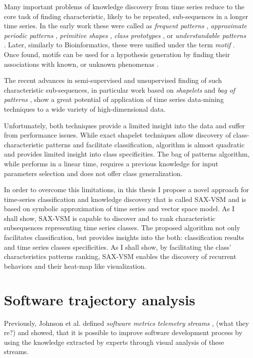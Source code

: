 Many important problems of knowledge discovery from time series reduce to the core task of finding 
characteristic, likely to be repeated, sub-sequences in a longer time series. 
In the early work these were called as 
\textit{frequent patterns} \cite{citeulike:5159615}, 
\textit{approximate periodic patterns} \cite{citeulike:1959582},
\textit{primitive shapes} \cite{citeulike:5898869}, 
\textit{class prototypes} \cite{citeulike:4406444}, 
or \textit{understandable patterns} \cite{citeulike:3978076}. 
Later, similarly to Bioinformatics, these were unified under the term \textit{motif} \cite{citeulike:3977965}.
Once found, motifs can be used for a hypothesis generation by finding their associations with known,
or unknown phenomenas \cite{citeulike:3977965}. 

The recent advances in semi-supervised and unsupervised finding of such characteristic sub-sequences, 
in particular work based on \textit{shapelets} \cite{citeulike:7344347} \cite{citeulike:11957982}
\cite{citeulike:12552293} and \textit{bag of patterns} \cite{citeulike:10525778}, show a great potential 
of application of time series data-mining techniques to a wide variety of high-dimensional data.

Unfortunately, both techniques provide a limited insight into the data and suffer from performance issues. 
While exact shapelet techniques allow discovery of class-characteristic patterns and facilitate classification,
algorithm is almost quadratic and provides limited insight into class specificities. 
The bag of patterns algorithm, while performs in a linear time, requires a previous knowledge for input parameters 
selection and does not offer class generalization.

In order to overcome this limitations, in this thesis I propose a novel approach for time-series classification and 
knowledge discovery that is called SAX-VSM and is based on symbolic approximation of time series and vector space model. 
As I shall show, SAX-VSM is capable to discover and to rank characteristic subsequences representing time series classes. 
The proposed algorithm not only facilitates classification, but provides insights into the both: classification results 
and time series classes specificities. As I shall show, by facilitating the class' characteristics patterns ranking,
SAX-VSM enables the discovery of recurrent behaviors and their heat-map like visualization. 

\section{Software trajectory analysis}\label{section_trajectory_definition}
Previously, Johnson et al. defined \textit{software metrics telemetry streams} \cite{citeulike:12550871}, 
(what they re?) and showed, that it is possible to improve software development process by using the 
knowledge extracted by experts through visual analysis of these streams.
 
